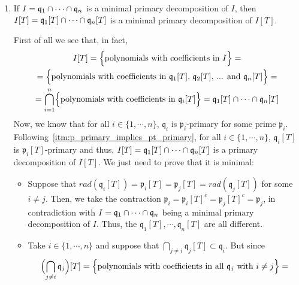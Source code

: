 \begin{problem}
\begin{enumerate}[label=(\theproblem.\arabic*),ref=\theproblem.\arabic*]
        \item If $I = \mathfrak{q}_1 \cap \cdots \cap \mathfrak{q}_n$ is a minimal primary decomposition of $I$, then $I[T] = \mathfrak{q}_1[T] \cap \cdots \cap \mathfrak{q}_n[T]$ is a minimal primary decomposition of $I[T]$.
        \begin{sol}
            First of all we see that, in fact,
            \begin{gather*}
                I[T] = \Bigl\{ \text{polynomials with coefficients in } I \Bigr\} =\\
                = \Bigl\{ \text{polynomials with coefficients in } \mathfrak{q}_1[T] \text{, } \mathfrak{q}_2[T] \text{, ... and } \mathfrak{q}_n[T] \Bigr\} =\\
                = \bigcap_{i=1}^n \Bigl\{ \text{polynomials with coefficients in } \mathfrak{q}_i[T] \Bigr\} = \mathfrak{q}_1[T] \cap \cdots \cap \mathfrak{q}_n[T]\\
            \end{gather*}
            Now, we know that for all $i \in \{ 1, \cdots, n \}$, $\mathfrak{q}_i$ is $\mathfrak{p}_i$-primary for some prime $\mathfrak{p}_i$.
            Following~\ref{itm:p_primary_implies_pt_primary}, for all $i \in \{ 1, \cdots, n \}$, $\mathfrak{q}_i[T]$ is $\mathfrak{p}_i[T]$-primary and thus, $I[T] = \mathfrak{q}_1[T] \cap \cdots \cap \mathfrak{q}_n[T]$ is a primary decomposition of $I[T]$.
            We just need to prove that it is minimal:
            \begin{itemize}
                \item
                Suppose that $rad(\mathfrak{q}_i[T]) = \mathfrak{p}_i[T] = \mathfrak{p}_j[T] = rad(\mathfrak{q}_j[T])$ for some $i \neq j$.
                Then, we take the contraction $\mathfrak{p}_i = \mathfrak{p}_i[T]^c = \mathfrak{p}_j[T]^c = \mathfrak{p}_j$, in contradiction with $I = \mathfrak{q}_1 \cap \cdots \cap \mathfrak{q}_n$ being a minimal primary decomposition of $I$.
                Thus, the $\mathfrak{q}_1[T], \cdots, \mathfrak{q}_n[T]$ are all different.
                \item
                Take $i \in \{ 1, \cdots, n \}$ and suppose that $\bigcap_{j \neq i} \mathfrak{q}_j[T] \subset \mathfrak{q}_i$.
                But since
                \begin{gather*}
                    \Bigl( \bigcap_{j \neq i} \mathfrak{q}_j \Bigr)[T] = \Bigl\{ \text{polynomials with coefficients in all } \mathfrak{q}_j \text{ with } i \neq j \Bigr\} =\\

\end{gather*}
\end{itemize}
\end{sol}
\end{enumerate}
\end{problem}
